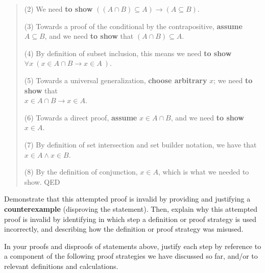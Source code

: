 \documentclass[12pt, oneside]{article}
\begin{document}
\begin{enumerate}[labelindent=0pt, leftmargin=0pt]
\begin{enumerate}
\begin{quote}
    (2) We need {\bf to show} $((A \cap B) \subseteq A) \to (A \subseteq B)$.
    
    (3) Towards a proof of the conditional by the contrapositive, {\bf assume} $A \subseteq B$, and we need {\bf to show} 
    that $(A \cap B) \subseteq A$.
    
    (4) By definition of subset inclusion, this means we need {\bf to show} 
    $\forall x ~( x \in A \cap B \to  x \in A  ~)$.
    
    (5) Towards a universal generalization, {\bf choose arbitrary} $x$; we need {\bf to show} that \\
    $x \in A \cap B \to x \in A$.
    
    (6) Towards a direct proof, {\bf assume} $x \in A \cap B$, and we need {\bf to show } $x \in A$.
    
    (7) By definition of set intersection and set builder notation, we have that $x \in A \land x \in B$.
    
    (8) By the definition of conjunction, $x \in A$, which is  what we needed to show. QED
    \end{quote}
    
    Demonstrate that this attempted proof is invalid by providing
    and justifying a {\bf counterexample} (disproving the statement).
    Then, explain why this attempted proof is 
    invalid by identifying in which step a definition or proof strategy is used incorrectly, and describing how the 
    definition or proof strategy was misused.

\end{enumerate}

\end{enumerate}
\vfill
\newpage
In your proofs and disproofs of statements above, justify each  step
by reference to  a component of the  following proof  strategies
we  have discussed so far, and/or to relevant definitions and calculations.
\end{document}
